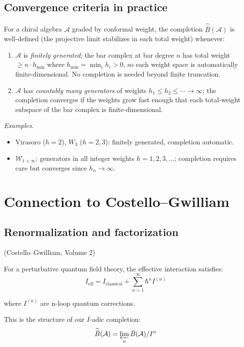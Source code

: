 \subsection{Convergence criteria in practice}

\begin{proposition}\label{prop:practical-convergence}
For a chiral algebra $\mathcal{A}$ graded by conformal weight, the completion
$\widehat{\bar{B}}(\mathcal{A})$ is well-defined (the projective limit stabilizes
in each total weight) whenever:
\begin{enumerate}
\item $\mathcal{A}$ is \emph{finitely generated}; the bar complex at bar degree $n$
has total weight $\geq n \cdot h_{\min}$ where $h_{\min} = \min_i h_i > 0$,
so each weight space is automatically finite-dimensional.  No completion is needed
beyond finite truncation.
\item $\mathcal{A}$ has \emph{countably many generators} of weights
$h_1 \leq h_2 \leq \cdots \to \infty$; the completion converges if the weights grow
fast enough that each total-weight subspace of the bar complex is finite-dimensional.
\end{enumerate}

\emph{Examples.}
\begin{itemize}
\item Virasoro ($h = 2$), $W_3$ ($h = 2, 3$): finitely generated, completion automatic.
\item $\mathcal{W}_{1+\infty}$: generators in all integer weights $h = 1, 2, 3, \ldots$;
completion requires care but converges since $h_n \to \infty$.
\end{itemize}
\end{proposition}

\section{Connection to Costello--Gwilliam}

\subsection{Renormalization and factorization}

\begin{theorem}\label{thm:CG-renorm}
\textup{(Costello--Gwilliam, Volume 2)}

For a perturbative quantum field theory, the effective interaction satisfies:
\[I_{\text{eff}} = I_{\text{classical}} + \sum_{n=1}^{\infty} \hbar^n I^{(n)}\]

where $I^{(n)}$ are n-loop quantum corrections.

This is the structure of our $I$-adic completion:
\[\widehat{\bar{B}}(\mathcal{A}) = \varprojlim_{n} \bar{B}(\mathcal{A})/I^n\]

\end{theorem}

